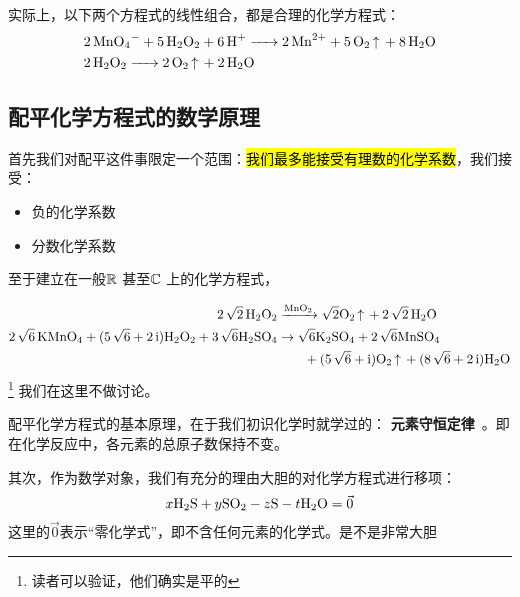 \documentclass{ctexart}
\begin{document}
实际上，以下两个方程式的线性组合，都是合理的化学方程式：
\begin{align*}
    &\ce{2 MnO4^- + 5 H2O2 + 6 H^+ -> 2 Mn^2+ + 5 O2 ^ + 8 H2O} \\
    &\ce{2 H2O2 -> 2 O2 ^ + 2 H2O}
\end{align*}

\subsection{配平化学方程式的数学原理}

首先我们对配平这件事限定一个范围：\hl{我们最多能接受有理数的化学系数}，我们接受：

\begin{itemize}
    \item \checkmark 负的化学系数
    \item \checkmark 分数化学系数
\end{itemize}
至于建立在一般\(\mathbb{R}\)
甚至\(\mathbb{C}\) 上的化学方程式，

\begin{align*}
    \ce{2\sqrt{2} H2O2 &->[MnO2] \sqrt{2}O2 ^ + 2\sqrt{2} H2O}\\
    \ce{2\sqrt{6} KMnO4 + (5\sqrt{6} + 2\i)H2O2 + 3\sqrt{6}H2SO4 &\to
        \sqrt{6}K2SO4 + 2\sqrt{6}MnSO4 \\
    & \qquad {} + (5\sqrt{6} + \i)O2 ^ + (8\sqrt{6} + 2\i)H2O}
\end{align*}\footnote{读者可以验证，他们确实是平的}
我们在这里不做讨论。

配平化学方程式的基本原理，在于我们初识化学时就学过的：
\textbf{元素守恒定律}~\cite{HuaXueJiuNianJiShangCe}。即在化学反应中，各元素的总原子数保持不变。

其次，作为数学对象，我们有充分的理由大胆的对化学方程式进行移项：
\[
    x \ce{H2S} + y \ce{SO2} - z \ce{S} - t \ce{H2O} = \vec{0}
\]
这里的\(\vec{0}\)表示“零化学式”，即不含任何元素的化学式。是不是非常大胆 
\end{document}
